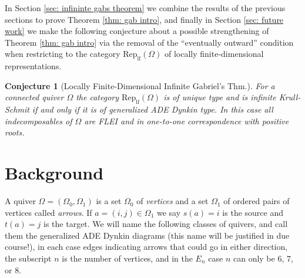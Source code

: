 \documentclass{article}
\newtheorem{letterconjecture}{Conjecture}
\begin{document}
In Section \ref{sec: infininte gabs theorem} we combine the results of the previous sections to prove Theorem \ref{thm: gab intro}, and finally in Section \ref{sec: future work} we make the following conjecture about a possible strengthening of Theorem \ref{thm: gab intro} via the removal of the ``eventually outward'' condition when restricting to the category $\text{Rep}_{\text{lf}}(\Omega)$ of locally finite-dimensional representations. 

\begin{letterconjecture}[Locally Finite-Dimensional Infinite Gabriel's Thm.]
For a connected quiver $\Omega$ the category $\text{Rep}_{\text{lf}}(\Omega)$ is of unique type and is infinite Krull-Schmit if and only if it is of generalized ADE Dynkin type. In this case all indecomposables of $\Omega$ are FLEI and in one-to-one correspondence with positive roots.
\end{letterconjecture}


\section{Background} \label{sec: background}

A quiver $\Omega=(\Omega_0, \Omega_1)$ is a set $\Omega_0$ of \emph{vertices} and a set $\Omega_1$ of ordered pairs of vertices called \emph{arrows}. If $a=(i,j) \in \Omega_1$ we say $s(a)=i$ is the source and $t(a)=j$ is the target. We will name the following classes of quivers, and call them the generalized ADE Dynkin diagrams (this name will be justified in due course!), in each case edges indicating arrows that could go in either direction, the subscript $n$ is the number of vertices, and in the $E_n$ case $n$ can only be $6$, $7$, or $8$.  

 

\end{document}
